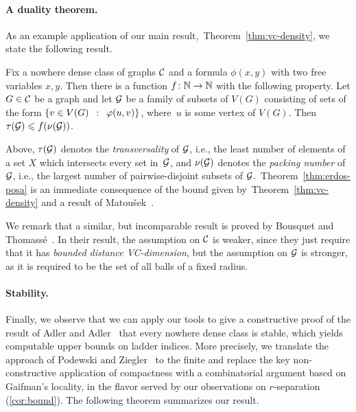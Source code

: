 \paragraph{A duality theorem.}
As an example application of our main result,~Theorem~\ref{thm:vc-density}, we state the following
 result.
 
\begin{theorem}\label{thm:erdos-posa}
	Fix a nowhere dense class of graphs $\CCC$ and a 
	formula $\phi(x,y)$ with two free variables $x,y$.
	Then there is a function $f\from \N\to\N$ with the following property.
	Let $G\in \CCC$ be a graph and let $\cal G$
	be a family of subsets of $V(G)$ consisting of sets of the form $\setof{v\in V(G)}{\phi(u, v)}$, where~$u$ is some vertex of $V(G)$.
Then~$\tau({\cal G})\le f(\nu(\cal G))$.
\end{theorem}

Above, $\tau(\cal G)$ denotes the \emph{transversality} of $\cal G$, i.e., the least number of elements of a set $X$ which intersects every set in~$\cal G$,
and $\nu(\cal G)$ denotes the \emph{packing number} of $\cal G$, i.e., the largest number of pairwise-disjoint subsets of $\cal G$.~Theorem~\ref{thm:erdos-posa} is an immediate consequence of the bound given by~Theorem~\ref{thm:vc-density} and a result of Matou{\v s}ek~\cite{Matousek:2004:BVI:1005787.1005789}.

We remark that a similar, but incomparable result
is proved by Bousquet and Thomass{\'e}~\cite{BousquetT15}.
In their result, the assumption on $\CCC$ is weaker, since they just require that it has \emph{bounded distance VC-dimension}, 
but the assumption on   $\cal G$ is stronger, as it is required to be the set of all balls of a fixed radius.





\paragraph{Stability.}
Finally, we observe that we can apply our  tools to give a constructive proof of the result of Adler and Adler~\cite{adler2014interpreting}
that every nowhere dense class is stable, which yields computable upper bounds on ladder indices.
More precisely, we translate the approach of Podewski and Ziegler~\cite{podewski1978stable} to the finite
and replace the key non-constructive application of compactness with a combinatorial argument based on Gaifman's locality,
in the flavor served by our observations on $r$-separation (\autoref{cor:bound}).
The following theorem summarizes our result.

